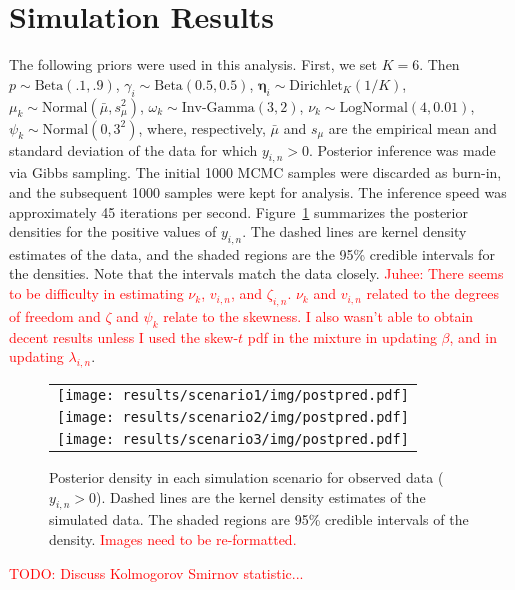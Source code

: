 \documentclass[12pt]{article} %
\newcommand{\Normal}{\text{Normal}}
\newcommand{\Beta}{\text{Beta}}
\newcommand{\InvGamma}{\text{Inv-Gamma}}
\newcommand{\Dirichlet}{\text{Dirichlet}}
\newcommand{\LogNormal}{\text{LogNormal}}
\newcommand{\alert}[1]{\textcolor{red}{#1}}
\begin{document}
\section{Simulation Results}\label{sec:sim-results}
The following priors were used in this analysis.
First, we set $K=6$. Then $p\sim\Beta(.1, .9)$, $\gamma_i\sim\Beta(0.5,
0.5)$, $\bm\eta_i\sim\Dirichlet_K(1/K)$, $\mu_k\sim\Normal(\bar{\mu}, s_\mu^2)$,
$\omega_k\sim\InvGamma(3, 2)$, $\nu_k\sim\LogNormal(4, 0.01)$,
$\psi_k\sim\Normal(0, 3^2)$, where, respectively, $\bar{\mu}$ and $s_\mu$ are
the empirical mean and standard deviation of the data for which $y_{i,n} >
0$. Posterior inference was made via Gibbs sampling. The initial 1000 MCMC
samples were discarded as burn-in, and the subsequent 1000 samples were kept
for analysis. The inference speed was approximately 45 iterations per second.
Figure~\ref{fig:sim-postdens} summarizes the posterior densities for the
positive values of $y_{i,n}$. The dashed lines are kernel density estimates
of the data, and the shaded regions are the 95\% credible intervals for the
densities. Note that the intervals match the data closely. 
\alert{Juhee: There seems to be difficulty in estimating $\nu_k$, $v_{i,n}$,
and $\zeta_{i,n}$. $\nu_k$ and $v_{i,n}$ related to the degrees of freedom
and $\zeta$ and $\psi_k$ relate to the skewness. I also wasn't able to obtain
decent results unless I used the skew-$t$ pdf in the mixture in updating
$\beta$, and in updating $\lambda_{i,n}$}.

\begin{figure}[t!]
  \centering
  \begin{tabular}{c}
    \texttt{[image: results/scenario1/img/postpred.pdf]} \\
    \texttt{[image: results/scenario2/img/postpred.pdf]} \\
    \texttt{[image: results/scenario3/img/postpred.pdf]} \\
  \end{tabular}
  \caption{Posterior density in each simulation scenario for observed data
  ($y_{i,n}>0$). Dashed lines are the kernel density estimates of the
  simulated data. The shaded regions are 95\% credible intervals of the
  density. \alert{Images need to be re-formatted.}}
  \label{fig:sim-postdens}
\end{figure}

\alert{TODO: Discuss Kolmogorov Smirnov statistic...}

% 
\end{document}
